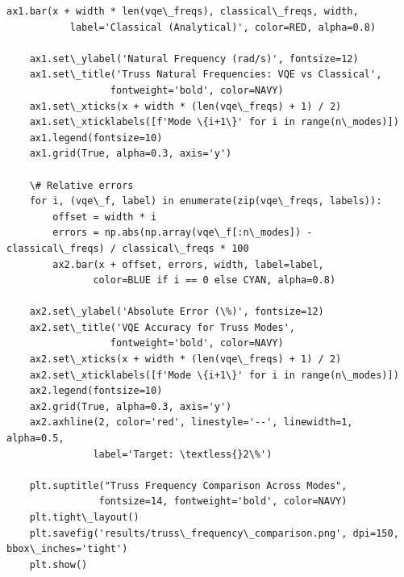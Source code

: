 \documentclass[12pt, a4paper]{article}
\begin{document}
\begin{lstlisting}[style=codestyle, caption={{visualize.py --- Beam and Truss Visualizations}}]
    ax1.bar(x + width * len(vqe\_freqs), classical\_freqs, width,
           label='Classical (Analytical)', color=RED, alpha=0.8)

    ax1.set\_ylabel('Natural Frequency (rad/s)', fontsize=12)
    ax1.set\_title('Truss Natural Frequencies: VQE vs Classical',
                  fontweight='bold', color=NAVY)
    ax1.set\_xticks(x + width * (len(vqe\_freqs) + 1) / 2)
    ax1.set\_xticklabels([f'Mode \{i+1\}' for i in range(n\_modes)])
    ax1.legend(fontsize=10)
    ax1.grid(True, alpha=0.3, axis='y')

    \# Relative errors
    for i, (vqe\_f, label) in enumerate(zip(vqe\_freqs, labels)):
        offset = width * i
        errors = np.abs(np.array(vqe\_f[:n\_modes]) - classical\_freqs) / classical\_freqs * 100
        ax2.bar(x + offset, errors, width, label=label,
               color=BLUE if i == 0 else CYAN, alpha=0.8)

    ax2.set\_ylabel('Absolute Error (\%)', fontsize=12)
    ax2.set\_title('VQE Accuracy for Truss Modes',
                  fontweight='bold', color=NAVY)
    ax2.set\_xticks(x + width * (len(vqe\_freqs) + 1) / 2)
    ax2.set\_xticklabels([f'Mode \{i+1\}' for i in range(n\_modes)])
    ax2.legend(fontsize=10)
    ax2.grid(True, alpha=0.3, axis='y')
    ax2.axhline(2, color='red', linestyle='--', linewidth=1, alpha=0.5,
               label='Target: \textless{}2\%')

    plt.suptitle("Truss Frequency Comparison Across Modes",
                fontsize=14, fontweight='bold', color=NAVY)
    plt.tight\_layout()
    plt.savefig('results/truss\_frequency\_comparison.png', dpi=150, bbox\_inches='tight')
    plt.show()

\end{lstlisting}

\end{document}
